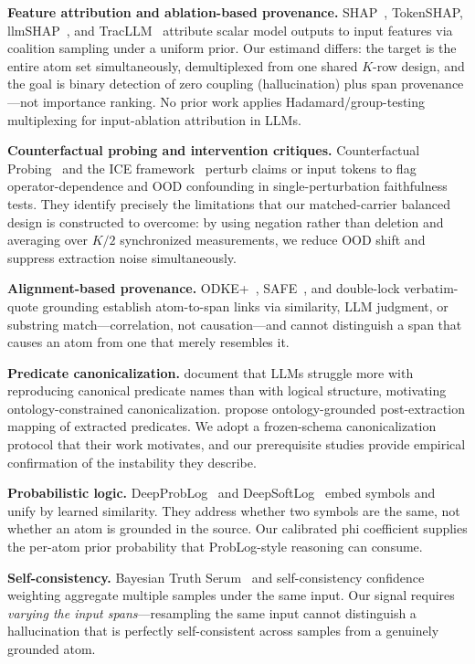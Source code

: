 \documentclass[11pt,letterpaper]{article}
\begin{document}
\textbf{Feature attribution and ablation-based provenance.}
SHAP~\citep{Lundberg2017}, TokenSHAP, llmSHAP~\citep{Naudot2025}, and TracLLM~\citep{Wang2025} attribute scalar model
outputs to input features via coalition sampling under a uniform prior. Our estimand differs: the target is the entire
atom set simultaneously, demultiplexed from one shared $K$-row design, and the goal is binary detection of zero
coupling (hallucination) plus span provenance---not importance ranking. No prior work applies Hadamard/group-testing
multiplexing for input-ablation attribution in LLMs.

\textbf{Counterfactual probing and intervention critiques.}
Counterfactual Probing~\citep{Feng2025} and the ICE framework~\citep{Basu2026} perturb claims or input tokens to flag
operator-dependence and OOD confounding in single-perturbation faithfulness tests. They identify precisely the
limitations that our matched-carrier balanced design is constructed to overcome: by using negation rather than deletion
and averaging over $K/2$ synchronized measurements, we reduce OOD shift and suppress extraction noise simultaneously.

\textbf{Alignment-based provenance.}
ODKE+~\citep{Khorshidi2025}, SAFE~\citep{Batista2025}, and double-lock verbatim-quote grounding establish
atom-to-span links via similarity, LLM judgment, or substring match---correlation, not causation---and cannot
distinguish a span that causes an atom from one that merely resembles it.

\textbf{Predicate canonicalization.}
\citet{Vossel2025} document that LLMs struggle more with reproducing canonical predicate names than with logical
structure, motivating ontology-constrained canonicalization. \citet{Chepurova2026} propose ontology-grounded
post-extraction mapping of extracted predicates. We adopt a frozen-schema canonicalization protocol that their work
motivates, and our prerequisite studies provide empirical confirmation of the instability they describe.

\textbf{Probabilistic logic.}
DeepProbLog~\citep{Manhaeve2018} and DeepSoftLog~\citep{Marra2023} embed symbols and unify by learned similarity.
They address whether two symbols are the same, not whether an atom is grounded in the source. Our calibrated phi
coefficient supplies the per-atom prior probability that ProbLog-style reasoning can consume.

\textbf{Self-consistency.}
Bayesian Truth Serum~\citep{Goel2023} and self-consistency confidence weighting aggregate multiple samples under the
same input. Our signal requires \emph{varying the input spans}---resampling the same input cannot distinguish a
hallucination that is perfectly self-consistent across samples from a genuinely grounded atom.
\end{document}
